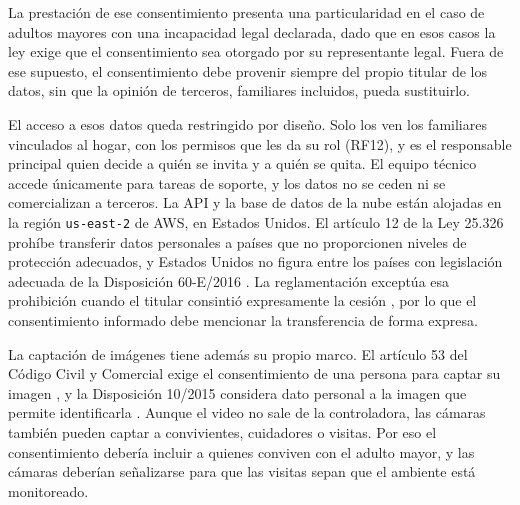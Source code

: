 La prestación de ese consentimiento presenta una particularidad en el caso de adultos mayores con una incapacidad legal declarada, dado que en esos casos la ley exige que el consentimiento sea otorgado por su representante legal.
Fuera de ese supuesto, el consentimiento debe provenir siempre del propio titular de los datos, sin que la opinión de terceros, familiares incluidos, pueda sustituirlo.

El acceso a esos datos queda restringido por diseño.
Solo los ven los familiares vinculados al hogar, con los permisos que les da su rol (RF12), y es el responsable principal quien decide a quién se invita y a quién se quita.
El equipo técnico accede únicamente para tareas de soporte, y los datos no se ceden ni se comercializan a terceros.
La API y la base de datos de la nube están alojadas en la región \texttt{us-east-2} de AWS, en Estados Unidos.
El artículo 12 de la Ley 25.326 prohíbe transferir datos personales a países que no proporcionen niveles de protección adecuados, y Estados Unidos no figura entre los países con legislación adecuada de la Disposición 60-E/2016 \parencite{Argentina2016}.
La reglamentación exceptúa esa prohibición cuando el titular consintió expresamente la cesión \parencite{Argentina2001}, por lo que el consentimiento informado debe mencionar la transferencia de forma expresa.

La captación de imágenes tiene además su propio marco.
El artículo 53 del Código Civil y Comercial exige el consentimiento de una persona para captar su imagen \parencite{Argentina2014}, y la Disposición 10/2015 considera dato personal a la imagen que permite identificarla \parencite{Argentina2015}.
Aunque el video no sale de la controladora, las cámaras también pueden captar a convivientes, cuidadores o visitas.
Por eso el consentimiento debería incluir a quienes conviven con el adulto mayor, y las cámaras deberían señalizarse para que las visitas sepan que el ambiente está monitoreado.

